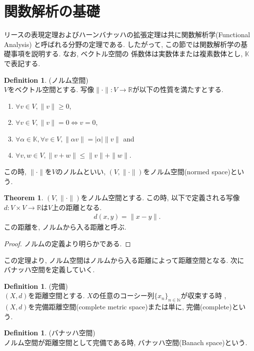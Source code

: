 \documentclass[11pt, a4paper, dvipdfmx]{jsarticle}
\theoremstyle{definition}
\newtheorem{Definition+}[Axiom+]{Definition}
\newtheorem{Theorem+}[Axiom+]{Theorem}
\newcommand{\N}{\mathbb{N}}
\newcommand{\R}{\mathbb{R}}
\newcommand{\K}{\mathbb{K}}
\newcommand{\normedsp}{(V, \|\cdot\|)}
\begin{document}
\section{関数解析の基礎}
リースの表現定理およびハーンバナッハの拡張定理は共に関数解析学(Functional Analysis)
と呼ばれる分野の定理である. したがって, この節では関数解析学の基礎事項を説明する. なお, ベクトル空間の
係数体は実数体または複素数体とし, $\K$で表記する.
\begin{Definition+}(ノルム空間)\\
    $V$をベクトル空間とする. 写像$\|\cdot\|:V\to\R$が以下の性質を満たすとする.
    \begin{enumerate}
        \item $\forall v\in V, \|v\| \geq 0$,
        \item $\forall v\in V, \|v\| = 0 \iff v = 0$,
        \item $\forall \alpha\in\K, \forall v\in V, \|\alpha v\| = |\alpha|\|v\|$ and 
        \item $\forall v, w\in V, \|v + w\|\leq \|v\| + \|w\|$.
    \end{enumerate}
    この時, $\|\cdot\|$を$V$のノルムといい, $(V, \|\cdot\|)$をノルム空間(normed space)という.
\end{Definition+}
\begin{Theorem+}
    $\normedsp$をノルム空間とする. この時, 以下で定義される写像$d:V\times V\to\R$は$V$上の距離となる.
    \begin{align*}
        d(x, y) = \|x - y\|.
    \end{align*}
    この距離を, ノルムから入る距離と呼ぶ.
    \begin{proof}
        ノルムの定義より明らかである.
    \end{proof}
\end{Theorem+}
この定理より, ノルム空間はノルムから入る距離によって距離空間となる. 次にバナッハ空間を定義していく.
\begin{Definition+}(完備)\\
    $(X, d)$を距離空間とする. $X$の任意のコーシー列$\{x_{n}\}_{n\in\N}$が収束する時
    , $(X, d)$を完備距離空間(complete metric space)または単に, 完備(complete)という.
\end{Definition+}

\begin{Definition+}(バナッハ空間)\\
    ノルム空間が距離空間として完備である時, バナッハ空間(Banach space)という.
\end{Definition+}
\end{document}
